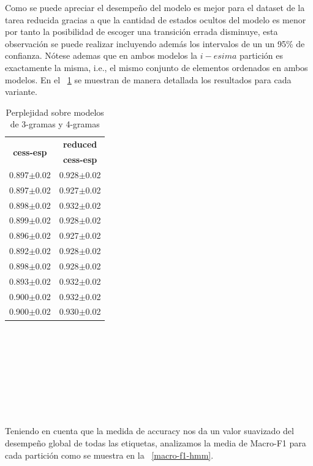\documentclass[11pt,a4paper]{report}
\begin{document}
	Como se puede apreciar el desempeño del modelo es mejor para el dataset de la tarea reducida gracias a que la cantidad de estados ocultos del modelo es menor por tanto la posibilidad de escoger una transición errada disminuye, esta observación se puede realizar incluyendo además los intervalos de un  un 95\% de confianza. Nótese ademas que en ambos modelos la $i-esima$ partición es exactamente la misma, i.e., el mismo conjunto de elementos ordenados en ambos modelos. En el \tablename~\ref{HMM_task1_table} se muestran de manera detallada los resultados para cada variante.
		\begin{table}[thb!]
		\begin{center} 		
			\begin{tabular}{cc} 
				\hline	
				\multirow{2}{*}{\textbf{cess-esp}}&\textbf{reduced}\\
				&\textbf{cess-esp}\\
				\hline
				0.897$\pm$0.02&0.928$\pm$0.02\\
				0.897$\pm$0.02&0.927$\pm$0.02\\
				0.898$\pm$0.02&0.932$\pm$0.02\\
				0.899$\pm$0.02&0.928$\pm$0.02\\
				0.896$\pm$0.02&0.927$\pm$0.02\\
				0.892$\pm$0.02&0.928$\pm$0.02\\
				0.898$\pm$0.02&0.928$\pm$0.02\\
				0.893$\pm$0.02&0.932$\pm$0.02\\
				0.900$\pm$0.02&0.932$\pm$0.02\\
				0.900$\pm$0.02&0.930$\pm$0.02\\
				\hline
			\end{tabular}
			\caption{Perplejidad sobre modelos de 3-gramas y 4-gramas}	
			\label{HMM_task1_table}
		\end{center}
	\end{table}		 	
	\\\\\\\\\\\\\\\\

	
	Teniendo en cuenta que la medida de accuracy nos da un valor suavizado del desempeño global de todas las etiquetas, analizamos la media de Macro-F1 para cada partición como se muestra en la \figurename~\ref{macro-f1-hmm}.
	
\end{document}
